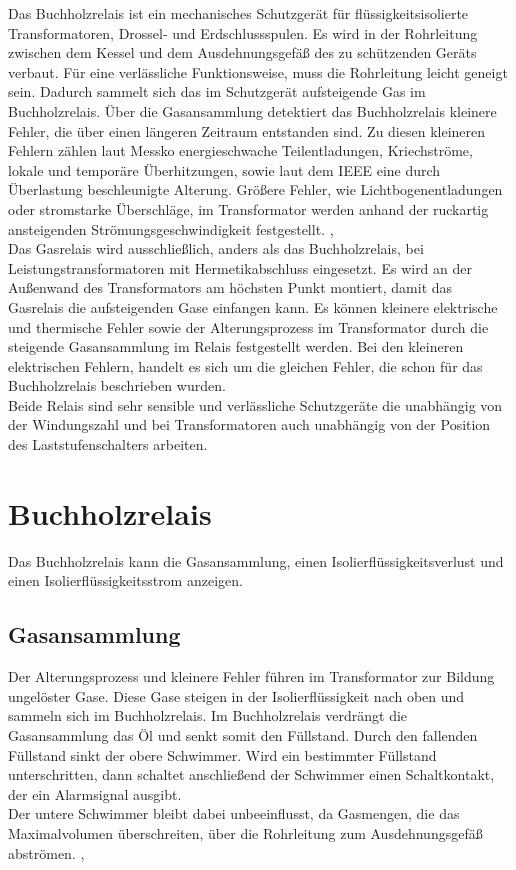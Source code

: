 Das Buchholzrelais ist ein mechanisches Schutzgerät für flüssigkeitsisolierte Transformatoren, Drossel- und Erdschlussspulen. Es wird in der Rohrleitung zwischen dem Kessel und dem Ausdehnungsgefäß des zu schützenden Geräts verbaut. Für eine verlässliche Funktionsweise, muss die Rohrleitung leicht geneigt sein. Dadurch sammelt sich das im Schutzgerät aufsteigende Gas im Buchholzrelais. Über die Gasansammlung detektiert das Buchholzrelais kleinere Fehler, die über einen längeren Zeitraum entstanden sind. Zu diesen kleineren Fehlern zählen laut Messko\cite{messkoManual} energieschwache Teilentladungen, Kriechströme, lokale und temporäre Überhitzungen, sowie laut dem IEEE\cite[][S. 32]{ieeeGuide} eine durch Überlastung beschleunigte Alterung. Größere Fehler, wie Lichtbogenentladungen oder stromstarke Überschläge, im Transformator werden anhand der ruckartig ansteigenden Strömungsgeschwindigkeit festgestellt.
\cite{embKatalog},
\cite[][S. 32ff]{abbManual}
\\
Das Gasrelais wird ausschließlich, anders als das Buchholzrelais, bei Leistungstransformatoren mit Hermetikabschluss eingesetzt. Es wird an der Außenwand des Transformators am höchsten Punkt montiert, damit das Gasrelais die aufsteigenden Gase einfangen kann. Es können kleinere elektrische und thermische Fehler sowie der Alterungsprozess im Transformator durch die steigende Gasansammlung im Relais festgestellt werden. Bei den kleineren elektrischen Fehlern, handelt es sich um die gleichen Fehler, die schon für das Buchholzrelais beschrieben wurden.
\cite[][S. 31ff]{ieeeGuide}
\\
Beide Relais sind sehr sensible und verlässliche Schutzgeräte die unabhängig von der Windungszahl und bei Transformatoren auch unabhängig von der Position des Laststufenschalters arbeiten.
\cite[][S. 32ff]{abbManual}


\section{Buchholzrelais}
Das Buchholzrelais kann die Gasansammlung, einen Isolierflüssigkeitsverlust und einen Isolierflüssigkeitsstrom anzeigen.

\subsection{Gasansammlung}
Der Alterungsprozess und kleinere Fehler führen im Transformator zur Bildung ungelöster Gase. Diese Gase steigen in der Isolierflüssigkeit nach oben und sammeln sich im Buchholzrelais. Im Buchholzrelais verdrängt die Gasansammlung das Öl und senkt somit den Füllstand. Durch den fallenden Füllstand sinkt der obere Schwimmer. Wird ein bestimmter Füllstand unterschritten, dann schaltet anschließend der Schwimmer einen Schaltkontakt, der ein Alarmsignal ausgibt.
\\
Der untere Schwimmer bleibt dabei unbeeinflusst, da Gasmengen, die das Maximalvolumen überschreiten, über die Rohrleitung zum Ausdehnungsgefäß abströmen.
\cite{embKatalog},
\cite{messkoManual}

